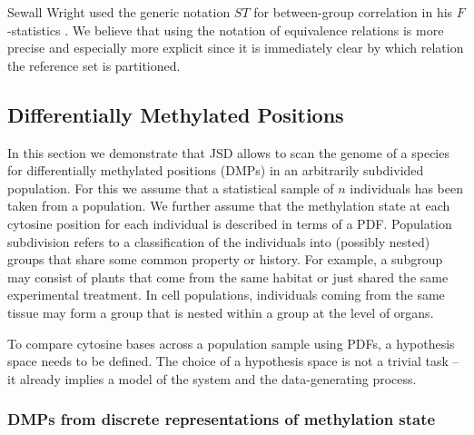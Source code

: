 \documentclass[a4paper]{article}
\begin{document}

Sewall Wright used the generic notation $ST$ for between-group
correlation in his $F$-statistics \cite{wright1949}. We believe that
using the notation of equivalence relations is more precise and
especially more explicit since it is immediately clear by which
relation the reference set is partitioned.


\subsection{Differentially Methylated Positions}
\label{sec:dmp}

In this section we demonstrate that JSD allows to scan the genome of a
species for differentially methylated positions (DMPs) in an
arbitrarily subdivided population. For this we assume that a
statistical sample of $n$ individuals has been taken from a
population. We further assume that the methylation state at each
cytosine position for each individual is described in terms of a PDF.
Population subdivision refers to a classification of the individuals
into (possibly nested) groups that share some common property or
history. For example, a subgroup may consist of plants that come from
the same habitat or just shared the same experimental treatment. In
cell populations, individuals coming from the same tissue may form a
group that is nested within a group at the level of organs.

To compare cytosine bases across a population sample using PDFs, a
hypothesis space needs to be defined. The choice of a hypothesis space
is not a trivial task -- it already implies a model of the system and
the data-generating process.

\subsubsection{DMPs from discrete representations of methylation state}
\label{sec:dmp-discrete}
\end{document}
